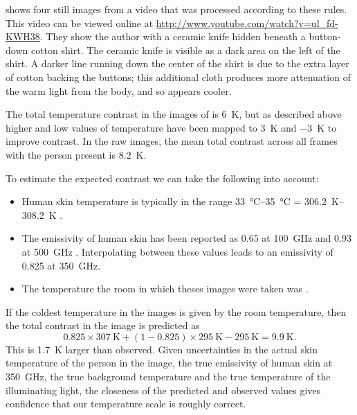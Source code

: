  shows four still images from a video that was processed according to these rules.
This video can be viewed online at \url{http://www.youtube.com/watch?v=ul_fd-KWH38}. %
They show the author with a ceramic knife hidden beneath a button-down cotton shirt.
The ceramic knife is visible as a dark area on the left of the shirt.
A darker line running down the center of the shirt is due to the extra layer of cotton backing the buttons; this additional cloth produces more attenuation of the warm light from the body, and so appears cooler.

The total temperature contrast in the images of  is \SI{6}{\K}, but as described above higher and low values of temperature have been mapped to \SI{+3}{\K} and \SI{-3}{\K} to improve contrast.
In the raw images, the mean total contrast across all frames with the person present is \SI{8.2}{\K}.

To estimate the expected contrast we can take the following into account:
\begin{itemize}
  \item Human skin temperature is typically in the range \SIrange{33}{35}{\celsius} = \SIrange{306.2}{308.2}{\K} \cite{ramanathan_new_1964}.
  \item The emissivity of human skin has been reported as \num{0.65} at \SI{100}{\GHz} and \num{0.93} at \SI{500}{\GHz} \cite{appleby_standoff_2007}.
        Interpolating between these values leads to an emissivity of \num{0.825} at \SI{350}{\GHz}.
  \item The temperature the room in which theses images were taken was .
\end{itemize}
If the coldest temperature in the images is given by the room temperature, then the total contrast in the image is predicted as
\begin{equation} \label{eqn:ch8-pred-contrast}
  0.825 \times \SI{307}{\K} + (1 - 0.825) \times \SI{295}{\K} - \SI{295}{\K} =  \SI{9.9}{\K}.
\end{equation}
This is \SI{1.7}{\K} larger than observed.
Given uncertainties in the actual skin temperature of the person in the image, the true emissivity of human skin at \SI{350}{\GHz}, the true background temperature and the true temperature of the illuminating light, the closeness of the predicted and observed values gives confidence that our temperature scale is roughly correct.

